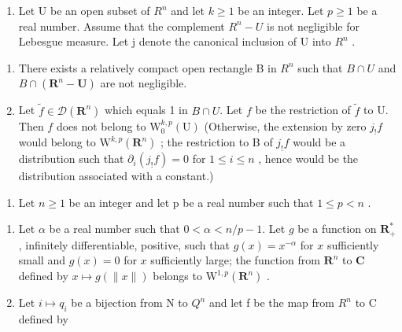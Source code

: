 \begin{enumerate}
\def\labelenumi{\arabic{enumi})}
\setcounter{enumi}{13}
\tightlist
\item
  Let U be an open subset of \(R^{n}\) and let \(k \geqslant 1\) be an integer. Let \(p \geqslant 1\) be a real number. Assume that the complement \(R^{n} - U\) is not negligible for Lebesgue measure. Let j denote the canonical inclusion of U into \(R^{n}\) .
\end{enumerate}

\begin{enumerate}
\def\labelenumi{\alph{enumi})}
\item
  There exists a relatively compact open rectangle B in \(R^{n}\) such that \(B \cap U\) and \(B \cap (\mathbf{R}^{n} - \mathbf{U})\) are not negligible.
\item
  Let \(\widetilde{f} \in \mathcal{D}(\mathbf{R}^n)\) which equals 1 in \(B \cap U\). Let \(f\) be the restriction of \(\widetilde{f}\) to U. Then \(f\) does not belong to \(\mathrm{W}_0^{k,p}(\mathrm{U})\) (Otherwise, the extension by zero \(j_{!}f\) would belong to \(\mathrm{W}^{k,p}(\mathbf{R}^n)\) ; the restriction to B of \(j_{!}f\) would be a distribution such that \(\partial_i(j_{!}f) = 0\) for \(1 \leqslant i \leqslant n\) , hence would be the distribution associated with a constant.)
\end{enumerate}

\begin{enumerate}
\def\labelenumi{\arabic{enumi})}
\setcounter{enumi}{14}
\tightlist
\item
  Let \(n \geqslant 1\) be an integer and let p be a real number such that \(1 \leqslant p < n\) .
\end{enumerate}

\begin{enumerate}
\def\labelenumi{\alph{enumi})}
\item
  Let \(\alpha\) be a real number such that \(0 < \alpha < n/p - 1\). Let \(g\) be a function on \(\mathbf{R}_{+}^{*}\) , infinitely differentiable, positive, such that \(g(x) = x^{-\alpha}\) for \(x\) sufficiently small and \(g(x) = 0\) for \(x\) sufficiently large; the function from \(\mathbf{R}^{n}\) to \(\mathbf{C}\) defined by \(x \mapsto g(\|x\|)\) belongs to \(\mathrm{W}^{1,p}(\mathbf{R}^{n})\) .
\item
  Let \(i \mapsto q_{i}\) be a bijection from N to \(Q^{n}\) and let f be the map from \(R^{n}\) to C defined by
\end{enumerate}

